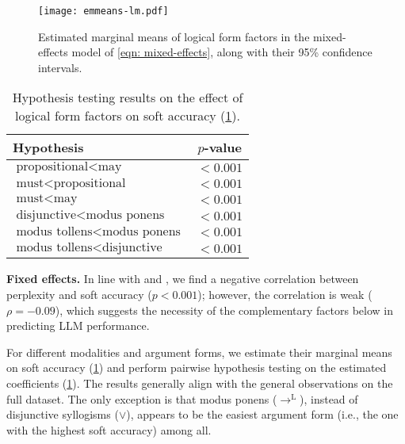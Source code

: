 \begin{figure}[t]
    \centering
    \vspace{-5pt}
    \texttt{[image: emmeans-lm.pdf]}
    \vspace{-10pt}
    \caption{
        Estimated marginal means of logical form factors in the mixed-effects model of \cref{eqn: mixed-effects}, along with their 95\% confidence intervals.
    }
    \vspace{-5pt}
    \label{fig:emmeans-lm}
\end{figure}
\begin{table}[t]
    \centering \small
    \begin{tabular}{lc}
        \toprule
        \textbf{Hypothesis}                           & \textbf{$p$-value} \\
        \midrule
        $\text{propositional} < \text{may}$           & $<0.001$           \\
        $\text{must} < \text{propositional}$          & $<0.001$           \\
        $\text{must} < \text{may}$                    & $<0.001$           \\
        \midrule
        $\text{disjunctive} < \text{modus ponens}$    & $<0.001$           \\
        $\text{modus tollens} < \text{modus ponens}$  & $<0.001$           \\
        $\text{modus tollens} < \text{disjunctive}  $ & $<0.001$           \\
        \bottomrule
    \end{tabular}
    \caption{
        \label{tab:hypothesis-test}
        Hypothesis testing results on the effect of logical form factors on soft accuracy (\cref{fig:emmeans-lm}).
        \vspace{-5pt}
    }
\end{table}

\vspace{3pt}\noindent\textbf{Fixed effects.}
In line with \citet{gonen-etal-2023-demystifying} and \citet{mccoyEmbersAutoregressionShow2024}, we find a negative correlation between perplexity and soft accuracy ($p<0.001$); however, the correlation is weak ($\rho=-0.09$), which suggests the necessity of the complementary factors below in predicting LLM performance.

For different modalities and argument forms, we estimate their marginal means on soft accuracy (\cref{fig:emmeans-lm}) and perform pairwise hypothesis testing on the estimated coefficients (\cref{tab:hypothesis-test}).
The results generally align with the general observations on the full dataset.
The only exception is that modus ponens ($\to^\mathrm{L}$), instead of disjunctive syllogisms ($\lor$), appears to be the easiest argument form (i.e., the one with the highest soft accuracy) among all.

